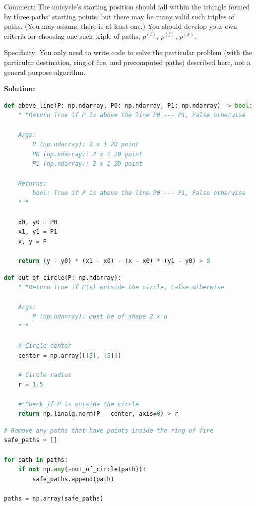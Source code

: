 \documentclass[conference,onecolumn]{IEEEtran}
\begin{document}
\begin{enumerate}[label=\arabic{enumi}.]
\begin{enumerate}
                    Comment: The unicycle's starting position should fall within the triangle formed by three paths' starting points, but there may be many valid such triples of paths.
                    (You may assume there is at least one.)
                    You should develop your own criteria for choosing one such triple of paths, $p^{(i)}$, $p^{(j)}$, $p^{(k)}$.

                    Specificity: You only need to write code to solve the particular problem (with the particular destination, ring of ﬁre, and precomputed paths) described here, not a general purpose algorithm.

                    \textbf{Solution:}

                    \begin{lstlisting}[language=Python]
def above_line(P: np.ndarray, P0: np.ndarray, P1: np.ndarray) -> bool:
    """Return True if P is above the line P0 --- P1, False otherwise

    Args:
        P (np.ndarray): 2 x 1 2D point
        P0 (np.ndarray): 2 x 1 2D point
        P1 (np.ndarray): 2 x 1 2D point

    Returns:
        bool: True if P is above the line P0 --- P1, False otherwise
    """

    x0, y0 = P0
    x1, y1 = P1
    x, y = P

    return (y - y0) * (x1 - x0) - (x - x0) * (y1 - y0) > 0
                    \end{lstlisting}
                    \begin{lstlisting}[language=Python]
def out_of_circle(P: np.ndarray):
    """Return True if P(s) outside the circle, False otherwise

    Args:
        P (np.ndarray): must be of shape 2 x n
    """

    # Circle center
    center = np.array([[5], [5]])

    # Circle radius
    r = 1.5

    # Check if P is outside the circle
    return np.linalg.norm(P - center, axis=0) > r
                    \end{lstlisting}
                    \begin{lstlisting}[language=Python]
# Remove any paths that have points inside the ring of fire
safe_paths = []

for path in paths:
    if not np.any(~out_of_circle(path)):
        safe_paths.append(path)

paths = np.array(safe_paths)


\end{lstlisting}
\end{enumerate}
\end{enumerate}
\end{document}

